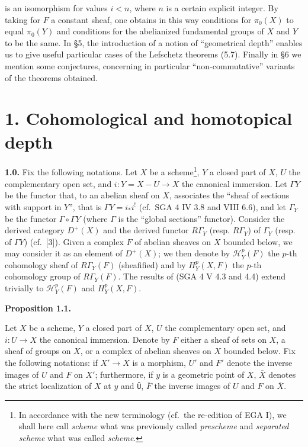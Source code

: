 \documentclass[
  11pt,
  a4paper,
]{book}
\begin{document}
is an isomorphism for values \(i < n\), where \(n\) is a certain
explicit integer. By taking for \(F\) a constant sheaf, one obtains in
this way conditions for \(\pi_{0}(X)\) to equal \(\pi_{0}(Y)\) and
conditions for the abelianized fundamental groups of \(X\) and \(Y\) to
be the same. In §5, the introduction of a notion of ``geometrical
depth'' enables us to give useful particular cases of the Lefschetz
theorems (5.7). Finally in §6 we mention some conjectures, concerning in
particular ``non-commutative'' variants of the theorems obtained.

\section{1. Cohomological and homotopical
depth}\label{cohomological-and-homotopical-depth}

\textbf{1.0.} Fix the following notations. Let \(X\) be a
scheme\footnote{In accordance with the new terminology (cf.~the
  re-edition of EGA I), we shall here call \emph{scheme} what was
  previously called \emph{prescheme} and \emph{separated scheme} what
  was called \emph{scheme}.}, \(Y\) a closed part of \(X\), \(U\) the
complementary open set, and \(i : Y = X - U \to X\) the canonical
immersion. Let \(\Gamma Y\) be the functor that, to an abelian sheaf on
\(X\), associates the ``sheaf of sections with support in \(Y\)'', that
is \(\Gamma Y = i_{*} i^{!}\) (cf.~SGA 4 IV 3.8 and VIII 6.6), and let
\(\Gamma_{Y}\) be the functor \(\Gamma \circ \Gamma Y\) (where
\(\Gamma\) is the ``global sections'' functor). Consider the derived
category \(D^{+}(X)\) and the derived functor \(R\Gamma_{Y}\) (resp.
\(R\Gamma_{Y}\)) of \(\Gamma_{Y}\) (resp. of \(\Gamma Y\))
(cf.~{[}3{]}). Given a complex \(F\) of abelian sheaves on \(X\) bounded
below, we may consider it as an element of \(D^{+}(X)\); we then denote
by \(\mathcal{H}^{p}_{Y}(F)\) the \(p\)-th cohomology sheaf of
\(R\Gamma_{Y}(F)\) (sheafified) and by \(H^{p}_{Y}(X, F)\) the \(p\)-th
cohomology group of \(R\Gamma_{Y}(F)\). The results of (SGA 4 V 4.3 and
4.4) extend trivially to \(\mathcal{H}^{p}_{Y}(F)\) and
\(H^{p}_{Y}(X, F)\).

\textbf{Proposition 1.1.}

Let \(X\) be a scheme, \(Y\) a closed part of \(X\), \(U\) the
complementary open set, and \(i : U \to X\) the canonical immersion.
Denote by \(F\) either a sheaf of sets on \(X\), a sheaf of groups on
\(X\), or a complex of abelian sheaves on \(X\) bounded below. Fix the
following notations: if \(X' \to X\) is a morphism, \(U'\) and \(F'\)
denote the inverse images of \(U\) and \(F\) on \(X'\); furthermore, if
\(y\) is a geometric point of \(X\), \(\bar{X}\) denotes the strict
localization of \(X\) at \(y\) and \texttt{Ū}, \(\bar{F}\) the inverse
images of \(U\) and \(F\) on \(\bar{X}\).
\end{document}

